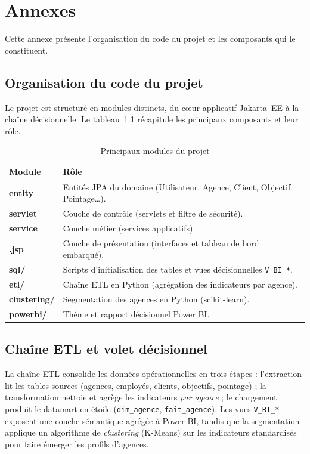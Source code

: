 \chapter{Annexes}

Cette annexe présente l'organisation du code du projet et les composants qui le
constituent.

\section{Organisation du code du projet}
Le projet est structuré en modules distincts, du cœur applicatif Jakarta~EE à la
chaîne décisionnelle. Le tableau~\ref{tab:modules} récapitule les principaux
composants et leur rôle.

\begin{table}[htbp]
\centering
\caption{Principaux modules du projet}
\label{tab:modules}
\renewcommand{\arraystretch}{1.25}
\begin{tabularx}{\textwidth}{>{\bfseries\ttfamily}p{3.6cm}X}
\toprule
\textmd{\textbf{Module}} & \textbf{Rôle}\\
\midrule
entity & Entités JPA du domaine (Utilisateur, Agence, Client, Objectif, Pointage\ldots).\\
servlet & Couche de contrôle (servlets et filtre de sécurité).\\
service & Couche métier (services applicatifs).\\
*.jsp & Couche de présentation (interfaces et tableau de bord embarqué).\\
sql/ & Scripts d'initialisation des tables et vues décisionnelles \texttt{V\_BI\_*}.\\
etl/ & Chaîne ETL en Python (agrégation des indicateurs par agence).\\
clustering/ & Segmentation des agences en Python (scikit-learn).\\
powerbi/ & Thème et rapport décisionnel Power BI.\\
\bottomrule
\end{tabularx}
\end{table}

\section{Chaîne ETL et volet décisionnel}
La chaîne ETL consolide les données opérationnelles en trois étapes : l'extraction
lit les tables sources (agences, employés, clients, objectifs, pointage) ;
la transformation nettoie et agrège les indicateurs \emph{par agence} ; le
chargement produit le datamart en étoile (\texttt{dim\_agence}, \texttt{fait\_agence}).
Les vues \texttt{V\_BI\_*} exposent une couche sémantique agrégée à Power BI, tandis
que la segmentation applique un algorithme de \emph{clustering} (K-Means) sur les
indicateurs standardisés pour faire émerger les profils d'agences.

